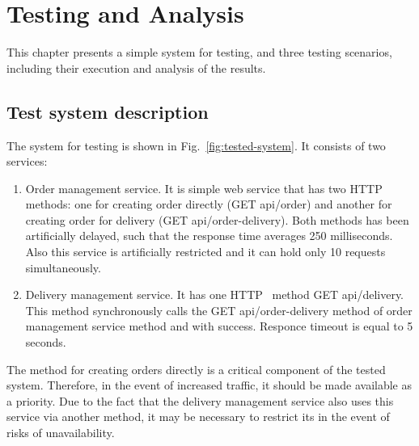 \chapter{Testing and Analysis}
\label{ch:testing}
\newcommand{\code}[1]{\colorbox{light-gray}{\texttt{#1}}}

This chapter presents a simple system for testing, and three testing scenarios, including their execution and analysis of the results.

\section{Test system description}\label{sec:test_system_description}
The system for testing is shown in Fig.~\ref{fig:tested-system}. It consists of two services:
\begin{enumerate}
    \item Order management service. It is simple web service that has two HTTP~\cite{http} methods: one for creating order directly (GET api/order) and another for creating order for delivery (GET api/order-delivery). Both methods has been artificially delayed, such that the response time averages 250 milliseconds. Also this service is artificially restricted and it can hold only 10 requests simultaneously.
    \item Delivery management service. It has one HTTP~\cite{http} method GET api/delivery. This method synchronously calls the GET api/order-delivery method of order management service method and with success. Responce timeout is equal to 5 seconds.
\end{enumerate}

The method for creating orders directly is a critical component of the tested system.
Therefore, in the event of increased traffic, it should be made available as a priority. Due to the fact that the delivery management service also uses this service via another method, it may be necessary to restrict its in the event of risks of unavailability.

